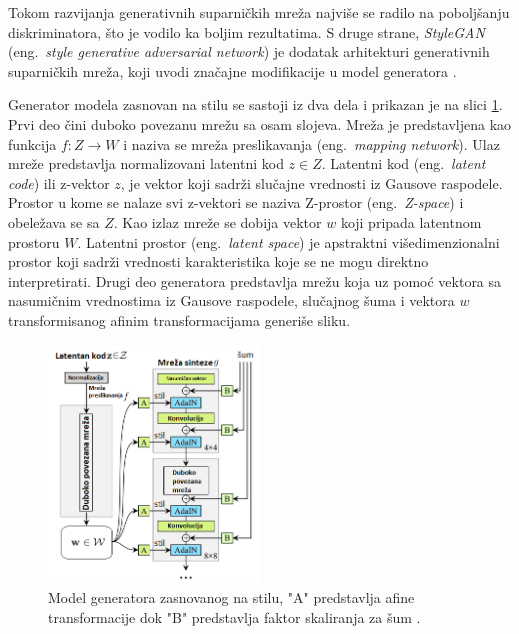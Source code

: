 \documentclass[12pt,oneside]{memoir}
\begin{document}
\clearpage
Tokom razvijanja generativnih suparničkih mreža najviše se radilo na poboljšanju diskriminatora, što je vodilo ka boljim rezultatima. S druge strane, \textit{StyleGAN} (eng.~\textit{style generative adversarial network}) je dodatak arhitekturi generativnih suparničkih mreža, koji uvodi značajne modifikacije u model generatora \cite{karras2019style}. 

Generator modela zasnovan na stilu se sastoji iz dva dela i prikazan je na slici \ref{fig:section2_augmentation_stylegan}. 
Prvi deo čini duboko povezanu mrežu sa osam slojeva. Mreža je predstavljena kao funkcija \(f: Z\to W\) i naziva se mreža preslikavanja (eng.~\textit{mapping network}). Ulaz mreže predstavlja normalizovani latentni kod \(z \in Z\). Latentni kod (eng.~\textit{latent code}) ili z-vektor \(z\), je vektor koji sadrži slučajne vrednosti iz Gausove raspodele. Prostor u kome se nalaze svi z-vektori se naziva Z-prostor (eng.~\textit{Z-space}) i obeležava se sa \(Z\). Kao izlaz mreže se dobija vektor \(w\) koji pripada latentnom prostoru \(W\). Latentni prostor (eng.~\textit{latent space}) je apstraktni višedimenzionalni prostor koji sadrži vrednosti karakteristika koje se ne mogu direktno interpretirati.
Drugi deo generatora predstavlja mrežu koja uz pomoć vektora sa nasumičnim vrednostima iz Gausove raspodele, slučajnog šuma i vektora \(w\) transformisanog afinim transformacijama generiše sliku. 

\begin{figure}[ht]
    \centering
    \includegraphics[width=0.5\textwidth]{matfmaster/glava2/stylegan_cus3.png}
    \caption{Model generatora zasnovanog na stilu, "A" predstavlja afine transformacije dok "B" predstavlja faktor skaliranja za šum \cite{karras2019style}. }
    \label{fig:section2_augmentation_stylegan}
\end{figure}
\end{document}

